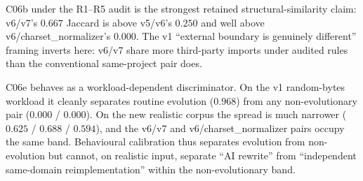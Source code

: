 \documentclass[11pt,letterpaper]{article}
\begin{document}
C06b under the R1--R5 audit is the strongest retained
structural-similarity claim: v6/v7's $0.667$ Jaccard is above
v5/v6's $0.250$ and well above v6/charset\_normalizer's $0.000$.
The v1 ``external boundary is genuinely different'' framing
inverts here: v6/v7 share more third-party imports under audited
rules than the conventional same-project pair does.

C06e behaves as a workload-dependent discriminator. On the v1
random-bytes workload it cleanly separates routine evolution
($0.968$) from any non-evolutionary pair ($0.000$ / $0.000$). On
the new realistic corpus the spread is much narrower
($0.625$ / $0.688$ / $0.594$), and the v6/v7 and
v6/charset\_normalizer pairs occupy the same band. Behavioural
calibration thus separates evolution from non-evolution but
cannot, on realistic input, separate ``AI rewrite'' from
``independent same-domain reimplementation'' within the
non-evolutionary band.


\end{document}
